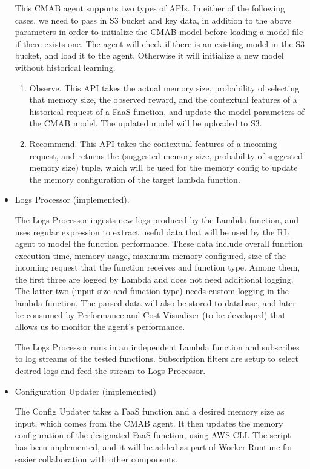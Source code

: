 \documentclass[conference]{IEEEtran}
\begin{document}
\begin{itemize}
This CMAB agent supports two types of APIs. In either of the following cases, we need to pass in S3 bucket and key data, in addition to the above parameters in order to initialize the CMAB model before loading a model file if there exists one. The agent will check if there is an existing model in the S3 bucket, and load it to the agent. Otherwise it will initialize a new model without historical learning.
\begin{enumerate}
    \item Observe. This API takes the actual memory size, probability of selecting that memory size, the observed reward, and the contextual features of a historical request of a FaaS function, and update the model parameters of the CMAB model. The updated model will be uploaded to S3.
    \item Recommend. This API takes the contextual features of a incoming request, and returns the (suggested memory size, probability of suggested memory size) tuple, which will be used for the memory config to update the memory configuration of the target lambda function.
\end{enumerate}

\item Logs Processor (implemented).

The Logs Processor ingests new logs produced by the Lambda function, and uses regular expression to extract useful data that will be used by the RL agent to model the function performance. These data include overall function execution time, memory usage, maximum memory configured, size of the incoming request that the function receives and function type. Among them, the first three are logged by Lambda and does not need additional logging. The latter two (input size and function type) needs custom logging in the lambda function. The parsed data will also be stored to database, and later be consumed by Performance and Cost Visualizer (to be developed) that allows us to monitor the agent's performance. 

The Logs Processor runs in an independent Lambda function and subscribes to log streams of the tested functions. Subscription filters are setup to select desired logs and feed the stream to Logs Processor.

\item Configuration Updater (implemented)

The Config Updater takes a FaaS function and a desired memory size as input, which comes from the CMAB agent. It then updates the memory configuration of the designated FaaS function, using AWS CLI. The script has been implemented, and it will be added as part of Worker Runtime for easier collaboration with other components.


\end{itemize}
\end{document}
